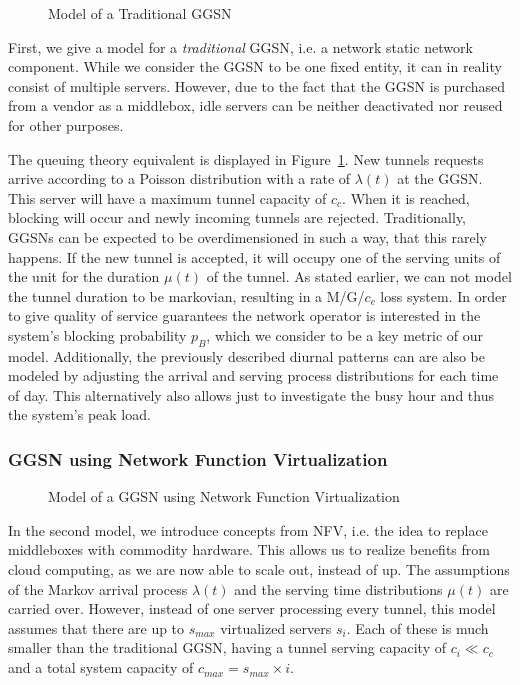 \begin{figure}[htb]
  \centering
  \resizebox{0.6\textwidth}{!}{}
  \caption{Model of a Traditional GGSN}
  \label{fig:model_traditional_ggsn}
\end{figure}

First, we give a model for a \emph{traditional} \gls{GGSN}, i.e. a network static network component.
While we consider the \gls{GGSN} to be one fixed entity, it can in reality consist of multiple servers. However, due to the fact that the \gls{GGSN} is purchased from a vendor as a middlebox, idle servers can be neither deactivated nor reused for other purposes.

The queuing theory equivalent is displayed in Figure~\ref{fig:model_traditional_ggsn}. New tunnels requests arrive according to a Poisson distribution with a rate of $\lambda(t)$ at the GGSN. This server will have a maximum tunnel capacity of $c_c$. When it is reached, blocking will occur and newly incoming tunnels are rejected. Traditionally, \glspl{GGSN} can be expected to be overdimensioned in such a way, that this rarely happens. If the new tunnel is accepted, it will occupy one of the serving units of the unit for the duration $\mu(t)$ of the tunnel. As stated earlier, we can not model the tunnel duration to be markovian, resulting in a  M/G/$c_c$ loss system. In order to give quality of service guarantees the network operator is interested in the system's blocking probability $p_B$, which we consider to be a key metric of our model. Additionally, the previously described diurnal patterns can are also be modeled by adjusting the arrival and serving process distributions for each time of day. This alternatively also allows just to investigate the busy hour and thus the system's peak load.


\subsubsection{GGSN using Network Function Virtualization}
\label{c4:sec:virtual_ggsn}

\begin{figure}[htb]
  \centering
  
  \caption{Model of a GGSN using Network Function Virtualization}
  \label{c4:fig:model_nfv_ggsn}
\end{figure}

In the second model, we introduce concepts from \gls{NFV}, i.e. the idea to replace middleboxes with commodity hardware. This allows us to realize benefits from cloud computing, as we are now able to scale out, instead of up. The assumptions of the Markov arrival process $\lambda(t)$ and the serving time distributions $\mu(t)$ are carried over. However, instead of one server processing every tunnel, this model assumes that there are up to $s_{max}$ virtualized servers $s_i$. Each of these is much smaller than the traditional GGSN, having a tunnel serving capacity of $c_i \ll c_c$ and a total system capacity of $c_{max} = s_{max} \times i$.

